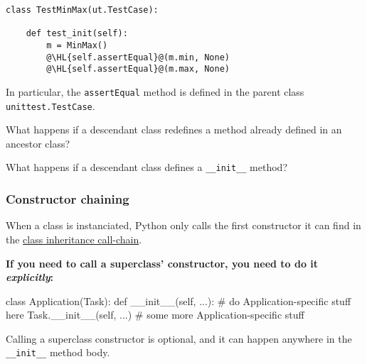 \documentclass[english,serif,mathserif,xcolor=pdftex,dvipsnames,table]{beamer}
\begin{document}
\begin{frame}[fragile]
\begin{lstlisting}
class TestMinMax(ut.TestCase):

    def test_init(self):
        m = MinMax()
        @\HL{self.assertEqual}@(m.min, None)
        @\HL{self.assertEqual}@(m.max, None)
\end{lstlisting}

  \+ 
  In particular, the \texttt{assertEqual} method is defined in the
  parent class \texttt{unittest.TestCase}.
\end{frame}


\begin{frame}
  What happens if a descendant class redefines a method already
  defined in an ancestor class?

  \+
\end{frame}


\begin{frame}
  What happens if a descendant class defines a \lstinline|__init__|
  method?

  \+ 
\end{frame}


\begin{frame}[fragile]
  \frametitle{Constructor chaining}

    When a class is instanciated, Python only calls the first
    constructor it can find in the
    \href{http://www.python.org/download/releases/2.3/mro/}{class inheritance call-chain}.

    \+ \textbf{If you need to call a superclass' constructor, you need
      to do it \emph{explicitly}:}
    \begin{python}
class Application(Task):
  def __init__(self, ...):
    # do Application-specific stuff here
    Task.__init__(self, ...)
    # some more Application-specific stuff
    \end{python}

    \+
    Calling a superclass constructor is optional, and
    it can happen anywhere in the \lstinline|__init__| method body.
\end{frame}
\end{document}
